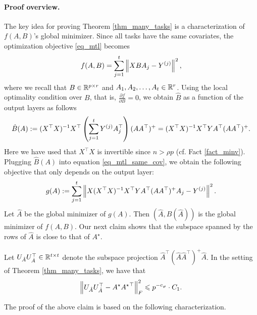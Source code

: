 \paragraph{Proof overview.} The key idea for proving Theorem \ref{thm_many_tasks} is a characterization of $f(A, B)$'s global minimizer.
	Since all tasks have the same covariates, the optimization objective \eqref{eq_mtl} becomes
	\begin{align}
		f(A, B) = \sum_{j=1}^t \left\| X B A_j - Y^{(j)} \right\|^2, \label{eq_mtl_same_cov}
	\end{align}
	where we recall that $B \in \mathbb{R}^{p \times r}$ and $A_1, A_2, \dots, A_t \in \mathbb{R}^r$.
	Using the local optimality condition over $B$, that is, $\frac{\partial f}{\partial B} = 0$, we obtain $\hat{B}$ as a function of the output layers as follows
	\begin{align} \label{eq_Bhat}
		\hat{B}(A) := (X^{\top}X)^{-1} X^{\top} \left({\sum_{j=1}^t Y^{(j)} A_j^{\top}}\right) (A  A^{\top})^{+}
		= (X^{\top} X)^{-1} X^{\top} Y A^{\top} (AA^{\top})^{+}.
	\end{align}
	Here we have used that $X^{\top}X$ is invertible since $n > \rho p$ (cf. Fact \ref{fact_minv}).
	Plugging $\hat{B}(A)$ into equation \eqref{eq_mtl_same_cov}, we obtain the following objective that only depends on the output layer:
	\begin{align}
		g(A) := \sum_{j=1}^t \left\| X (X^{\top}X)^{-1}X^{\top} Y A^{\top} (AA^{\top})^{+} A_j - Y^{(j)} \right\|^2. \label{eq_mtl_output_layer}
	\end{align}
	Let $\hat{A}$ be the global minimizer of $g(A)$. Then  $(\hat{A}, \hat{B}(\hat A))$ is the global minimizer of $f(A, B)$. 
	Our next claim shows that the subspace spanned by the rows of $\hat{A}$ is close to that of $A^{\star}$.
	\begin{claim}\label{claim_opt_dist}
		Let $U_{\hat{A}} U_{\hat{A}}^{\top} \in\mathbb{R}^{t\times t}$ denote the subspace projection $\hat{A}^{\top} (\hat{A}\hat{A}^{\top})^{+} \hat{A}$.
		In the setting of Theorem \ref{thm_many_tasks}, we have that
		\[ \left\| U_{\hat{A}} U_{\hat{A}}^{\top} - A^{\star} {A^{\star}}^{\top} \right\|_{F}^2
				\leqslant  p^{-c_{\varphi}} \cdot C_1. \]
	\end{claim}
	The proof of the above claim is based on the following characterization.

